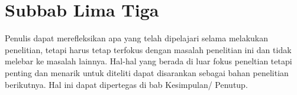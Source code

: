 \section{Subbab Lima Tiga}
Penulis dapat merefleksikan apa yang telah dipelajari selama melakukan penelitian, tetapi harus tetap terfokus dengan masalah penelitian ini dan tidak melebar ke masalah lainnya. Hal-hal yang berada di luar fokus peneltian tetapi penting dan menarik untuk diteliti dapat disarankan sebagai bahan penelitian berikutnya. Hal ini dapat dipertegas di bab Kesimpulan/ Penutup. 
